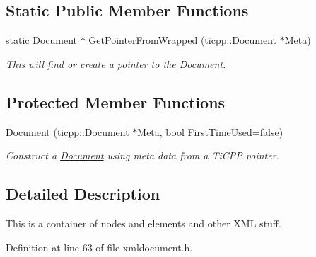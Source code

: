 \subsection*{Static Public Member Functions}
\begin{DoxyCompactItemize}
\item 
static \hyperlink{classphys_1_1xml_1_1Document}{Document} $\ast$ \hyperlink{classphys_1_1xml_1_1Document_a1cc5102a56f494011cae192007ecf19d}{GetPointerFromWrapped} (ticpp::Document $\ast$Meta)
\begin{DoxyCompactList}\small\item\em This will find or create a pointer to the \hyperlink{classphys_1_1xml_1_1Document}{Document}. \item\end{DoxyCompactList}\end{DoxyCompactItemize}
\subsection*{Protected Member Functions}
\begin{DoxyCompactItemize}
\item 
\hyperlink{classphys_1_1xml_1_1Document_a4476480f12a9b2e71db8333c8ca210e4}{Document} (ticpp::Document $\ast$Meta, bool FirstTimeUsed=false)
\begin{DoxyCompactList}\small\item\em Construct a \hyperlink{classphys_1_1xml_1_1Document}{Document} using meta data from a TiCPP pointer. \item\end{DoxyCompactList}\end{DoxyCompactItemize}


\subsection{Detailed Description}
This is a container of nodes and elements and other XML stuff. 

Definition at line 63 of file xmldocument.h.



